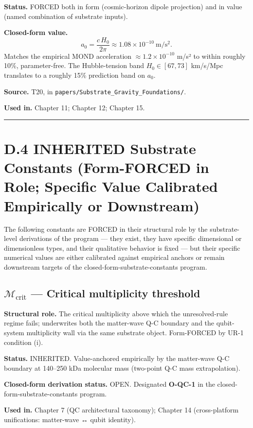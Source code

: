 \documentclass[11pt]{book}
\begin{document}
\textbf{Status.} FORCED both in form (cosmic-horizon dipole projection) and in value (named combination of substrate inputs).

\textbf{Closed-form value.}
\[
a_0 = \frac{c\,H_0}{2\pi} \approx 1.08 \times 10^{-10}\ \mathrm{m/s^2}.
\]
Matches the empirical MOND acceleration $\approx 1.2 \times 10^{-10}$ m/s² to within roughly 10\%, parameter-free. The Hubble-tension band $H_0 \in [67, 73]$ km/s/Mpc translates to a roughly 15\% prediction band on $a_0$.

\textbf{Source.} T20, in \texttt{papers/Substrate\_Gravity\_Foundations/}.

\textbf{Used in.} Chapter 11; Chapter 12; Chapter 15.

\bigskip\hrule\bigskip

\section{D.4 INHERITED Substrate Constants (Form-FORCED in Role; Specific Value Calibrated Empirically or Downstream)}

The following constants are FORCED in their structural role by the substrate-level derivations of the program — they exist, they have specific dimensional or dimensionless types, and their qualitative behavior is fixed — but their specific numerical values are either calibrated against empirical anchors or remain downstream targets of the closed-form-substrate-constants program.

\subsection{$\mathcal{M}_\mathrm{crit}$ — Critical multiplicity threshold}

\textbf{Structural role.} The critical multiplicity above which the unresolved-rule regime fails; underwrites both the matter-wave Q-C boundary and the qubit-system multiplicity wall via the same substrate object. Form-FORCED by UR-1 condition (i).

\textbf{Status.} INHERITED. Value-anchored empirically by the matter-wave Q-C boundary at 140–250 kDa molecular mass (two-point Q-C mass extrapolation).

\textbf{Closed-form derivation status.} OPEN. Designated \textbf{O-QC-1} in the closed-form-substrate-constants program.

\textbf{Used in.} Chapter 7 (QC architectural taxonomy); Chapter 14 (cross-platform unifications: matter-wave ↔ qubit identity).
\end{document}
